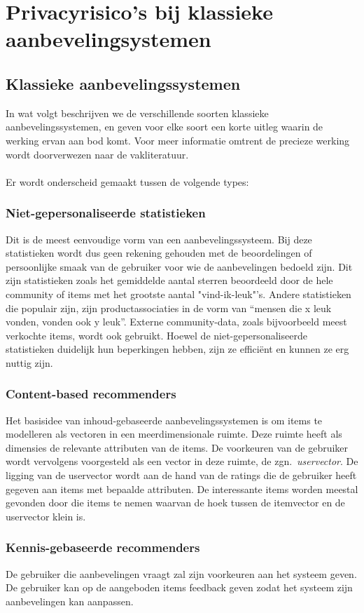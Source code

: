 \chapter{Privacyrisico's bij klassieke aanbevelingsystemen}
\label{privacyklassiek}

\section{Klassieke aanbevelingssystemen}
\label{sec:klassiek}
In wat volgt beschrijven we de verschillende soorten klassieke aanbevelingssystemen, en geven voor elke soort een korte uitleg waarin de werking ervan aan bod komt. Voor meer informatie omtrent de precieze werking wordt doorverwezen naar de vakliteratuur. \\
\\
Er wordt onderscheid gemaakt tussen de volgende types:
\subsection{Niet-gepersonaliseerde statistieken}
Dit is de meest eenvoudige vorm van een aanbevelingssysteem. Bij deze statistieken wordt dus geen rekening gehouden met de beoordelingen of persoonlijke smaak van de gebruiker voor wie de aanbevelingen bedoeld zijn. Dit zijn statistieken zoals het gemiddelde aantal sterren beoordeeld door de hele community of items met het grootste aantal "vind-ik-leuk"'s. Andere statistieken die populair zijn, zijn productassociaties in de vorm van “mensen die x leuk vonden, vonden ook y leuk”. Externe community-data, zoals bijvoorbeeld meest verkochte items, wordt ook gebruikt.  Hoewel de niet-gepersonaliseerde statistieken duidelijk hun beperkingen hebben, zijn ze effici\"ent en kunnen ze erg nuttig zijn. 
\subsection{Content-based recommenders}
Het basisidee van inhoud-gebaseerde aanbevelingssystemen is om items te modelleren als vectoren in een meerdimensionale ruimte. Deze ruimte heeft als dimensies de relevante attributen van de items. De voorkeuren van de gebruiker wordt vervolgens voorgesteld als een vector in deze ruimte, de zgn.~\textit{uservector}. De ligging van de uservector wordt aan de hand van de ratings die de gebruiker heeft gegeven aan items met bepaalde attributen. De interessante items worden meestal gevonden door die items te nemen waarvan de hoek tussen de itemvector en de uservector klein is. 
\subsection{Kennis-gebaseerde recommenders}
De gebruiker die aanbevelingen vraagt zal zijn voorkeuren aan het systeem geven. De gebruiker kan op de aangeboden items feedback geven zodat het systeem zijn aanbevelingen kan aanpassen.

